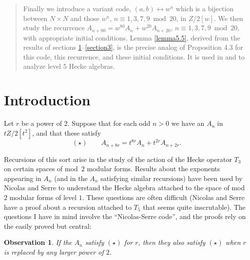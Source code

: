 \documentclass{monsky2009}
\newtheorem{observation}[definition]{Observation}
\begin{document}
\begin{frontmatter}
\begin{abstract}
Finally we introduce a variant code, $(a,b) \leftrightarrow w^{n}$ which is a bijection between $N\times N$ and those $w^{n}$, $n \equiv 1,3,7,9 \bmod{20}$,  in $Z/2[w]$. We then study the recurrence $A_{n+80}= w^{80} A_{n}+ w^{20} A_{n+20}$, $n \equiv 1,3,7,9 \bmod{20}$, with appropriate initial conditions. Lemma \ref{lemma5.5}, derived from the results of sections \ref{section1}--\ref{section3}, is the precise analog of Proposition 4.3 for this code, this recurrence, and these initial conditions. It is used in \cite{4} and \cite{5} to analyze level 5 Hecke algebras.


\end{abstract}


\end{frontmatter}


\section{Introduction}
\label{section1}

Let $r$ be a power of $2$. Suppose that for each odd $n>0$ we have an $A_{n}$ in $tZ/2[t^{2}]$, and that these satisfy 
\[
(\star)\qquad
A_{n+8r} = t^{8r}A_{n}+t^{2r}A_{n+2r}.
\]

Recursions of this sort arise in the study of the action of the Hecke operator $T_{3}$ on certain spaces of mod~$2$ modular forms. Results about the exponents appearing in $A_{n}$ (and in the $A_{n}$ satisfying similar recursions) have been used by Nicolas and Serre \cite{6} to understand the Hecke algebra attached to the space of mod $2$ modular forms of level $1$. These questions are often difficult (Nicolas and Serre have a proof about a recursion attached to $T_{5}$ that seems quite inscrutable). The questions I have in mind involve the ``Nicolas-Serre code'', and the proofs rely on the easily proved but central:

\begin{observation}
\label{observation1.1}
If the $A_{n}$ satisfy $(\star)$ for $r$, then they also satisfy $(\star)$ when $r$ is replaced by any larger power of $2$.
\end{observation}
\end{document}

